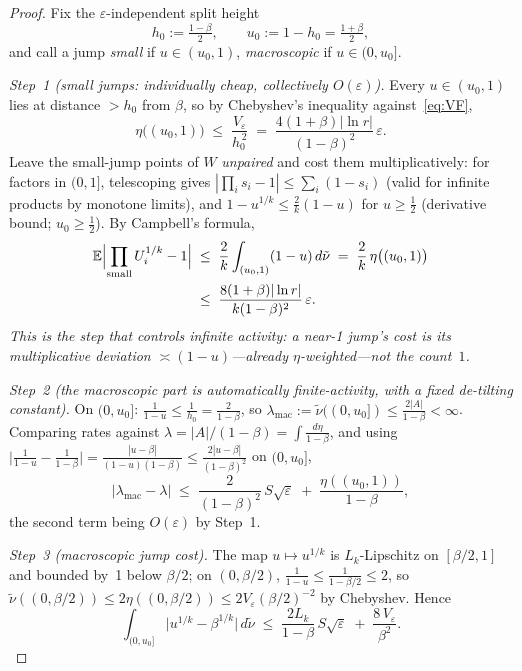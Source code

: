 \documentclass[12pt]{amsart}
\theoremstyle{definition}
\theoremstyle{remark}
\begin{document}
\begin{proof}
Fix the $\varepsilon$-independent split height
\[
  h_0 := \tfrac{1-\beta}{2},
  \qquad
  u_0 := 1 - h_0 = \tfrac{1+\beta}{2},
\]
and call a jump \emph{small} if $u \in (u_0, 1)$, \emph{macroscopic}
if $u \in (0, u_0]$.

\textit{Step~1 (small jumps: individually cheap, collectively
$O(\varepsilon)$).}  Every $u \in (u_0,1)$ lies at distance
$> h_0$ from $\beta$, so by Chebyshev's inequality
against~\eqref{eq:VF},
\[
  \eta\bigl((u_0,1)\bigr) \;\le\; \frac{V_\varepsilon}{h_0^{\,2}}
  \;=\; \frac{4(1+\beta)|\ln r|}{(1-\beta)^2}\,\varepsilon .
\]
Leave the small-jump points of $W$ \emph{unpaired} and cost them
multiplicatively: for factors in $(0,1]$, telescoping gives
$|\prod_i s_i - 1| \le \sum_i(1-s_i)$ (valid for infinite products
by monotone limits), and $1 - u^{1/k} \le \tfrac2k(1-u)$ for $u \ge
\tfrac12$ (derivative bound; $u_0 \ge \tfrac12$).  By Campbell's
formula,
\[
\begin{aligned}
  \mathbb{E}\Bigl|\prod_{\text{small}} U_i^{1/k} - 1\Bigr|
  \;&\le\; \frac2k\int_{(u_0,1)}(1-u)\,d\tilde\nu
  \;=\; \frac2k\,\eta\bigl((u_0,1)\bigr)\\
  \;&\le\; \frac{8(1+\beta)|\ln r|}{k(1-\beta)^2}\,\varepsilon .
\end{aligned}
\]
\emph{This is the step that controls infinite activity: a near-1
jump's cost is its multiplicative deviation $\asymp(1-u)$---already
$\eta$-weighted---not the count~$1$.}

\textit{Step~2 (the macroscopic part is automatically
finite-activity, with a fixed de-tilting constant).}  On $(0,u_0]$:
$\tfrac1{1-u} \le \tfrac1{h_0} = \tfrac2{1-\beta}$, so
$\lambda_{\mathrm{mac}} := \tilde\nu((0,u_0]) \le
\tfrac{2|A|}{1-\beta} < \infty$.  Comparing rates against
$\lambda = |A|/(1-\beta) = \int\tfrac{d\eta}{1-\beta}$, and using
$\bigl|\tfrac1{1-u} - \tfrac1{1-\beta}\bigr| =
\tfrac{|u-\beta|}{(1-u)(1-\beta)} \le
\tfrac{2|u-\beta|}{(1-\beta)^2}$ on $(0,u_0]$,
\[
  \bigl|\lambda_{\mathrm{mac}} - \lambda\bigr|
  \;\le\; \frac{2}{(1-\beta)^2}\,S\sqrt{\varepsilon}
  \;+\; \frac{\eta((u_0,1))}{1-\beta},
\]
the second term being $O(\varepsilon)$ by Step~1.

\textit{Step~3 (macroscopic jump cost).}  The map $u \mapsto
u^{1/k}$ is $L_k$-Lipschitz on $[\beta/2,1]$ and bounded by~1
below $\beta/2$; on $(0,\beta/2)$, $\tfrac1{1-u} \le
\tfrac1{1-\beta/2} \le 2$, so
$\tilde\nu((0,\beta/2)) \le 2\eta((0,\beta/2)) \le
2V_\varepsilon(\beta/2)^{-2}$ by Chebyshev.  Hence
\[
  \int_{(0,u_0]}\bigl|u^{1/k} - \beta^{1/k}\bigr|\,d\tilde\nu
  \;\le\; \frac{2L_k}{1-\beta}\,S\sqrt{\varepsilon}
  \;+\; \frac{8\,V_\varepsilon}{\beta^2}.
\]


\end{proof}
\end{document}
